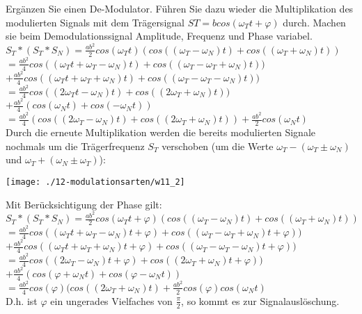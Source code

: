 Ergänzen Sie einen De-Modulator. Führen Sie dazu wieder die Multiplikation des modulierten Signals mit dem Trägersignal $ST = bcos(\omega_Tt+\varphi )$ durch.
Machen sie beim Demodulationssignal Amplitude, Frequenz und Phase variabel.\\
$S_T*(S_T*S_N)=\frac{ab^2}{2}cos(\omega_Tt)(cos((\omega_T-\omega_N)t)+cos((\omega_T+\omega_N)t))$\\
$=\frac{ab^2}{4}cos((\omega_Tt+\omega_T-\omega_N)t)+cos((\omega_T-\omega_T+\omega_N)t))$\\
$+\frac{ab^2}{4}cos((\omega_Tt+\omega_T+\omega_N)t)+cos((\omega_T-\omega_T-\omega_N)t))$\\
$=\frac{ab^2}{4}cos((2\omega_Tt-\omega_N)t)+cos((2\omega_T+\omega_N)t))$\\
$+\frac{ab^2}{4}(cos(\omega_Nt)+cos(-\omega_Nt))$\\
$=\frac{ab^2}{4}(cos((2\omega_T-\omega_N)t)+cos((2\omega_T+\omega_N)t))+\frac{ab^2}{2}cos(\omega_Nt)$\\

Durch die erneute Multiplikation werden die bereits modulierten Signale nochmals um die Trägerfrequenz $S_T$ verschoben (um die Werte $\omega_T-(\omega_T\pm \omega_N)$ und $\omega_T+(\omega_N\pm  \omega_T)$):
\begin{center}
    \vspace{-8pt}
    \texttt{[image: ./12-modulationsarten/w11\_2]}
    \vspace{-8pt}
\end{center}

Mit Berücksichtigung der Phase gilt:\\
$S_T*(S_T*S_N)=\frac{ab^2}{2}cos(\omega_Tt+\varphi )(cos((\omega_T-\omega_N)t)+cos((\omega_T+\omega_N)t))$\\
$=\frac{ab^2}{4}cos((\omega_Tt+\omega_T-\omega_N)t+\varphi )+cos((\omega_T-\omega_T+\omega_N)t+\varphi ))$\\
$+\frac{ab^2}{4}cos((\omega_Tt+\omega_T+\omega_N)t+\varphi )+cos((\omega_T-\omega_T-\omega_N)t+\varphi ))$\\
$=\frac{ab^2}{4}cos((2\omega_T-\omega_N)t+\varphi )+cos((2\omega_T+\omega_N)t+\varphi ))$\\
$+\frac{ab^2}{4}(cos(\varphi +\omega_Nt)+cos(\varphi -\omega_Nt))$\\
$=\frac{ab^2}{4}cos(\varphi )(cos((2\omega_T+\omega_N)t)+\frac{ab^2}{2}cos(\varphi )cos(\omega_Nt)$\\
D.h. ist $\varphi $ ein ungerades Vielfaches von $\frac{\pi}{2}$, so kommt es zur Signalauslöschung.\\

